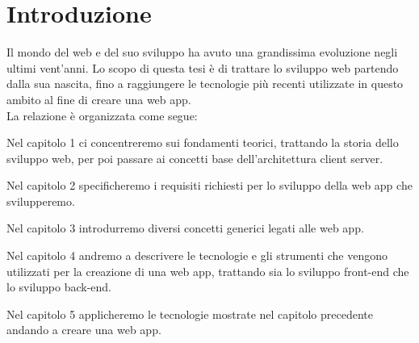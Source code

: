 \cleardoublepage
\begingroup
\let\clearpage\endgroup
\null{}

\chapter*{\centering Introduzione}

Il mondo del web e del suo sviluppo ha avuto una grandissima evoluzione negli ultimi vent'anni.
Lo scopo di questa tesi è di trattare lo sviluppo web partendo dalla sua nascita, fino a raggiungere
le tecnologie più recenti utilizzate in questo ambito al fine di creare una web app.
\\
La relazione è organizzata come segue:

Nel capitolo 1 ci concentreremo sui fondamenti teorici, trattando la storia dello sviluppo web, per poi passare ai concetti base dell'architettura client server.

Nel capitolo 2 specificheremo i requisiti richiesti per lo sviluppo della web app che svilupperemo.

Nel capitolo 3 introdurremo diversi concetti generici legati alle web app.

Nel capitolo 4 andremo a descrivere le tecnologie e gli strumenti che vengono utilizzati per la creazione di una web app, trattando sia lo sviluppo front-end che lo sviluppo back-end.

Nel capitolo 5 applicheremo le tecnologie mostrate nel capitolo precedente andando a creare una web app.



 \null

